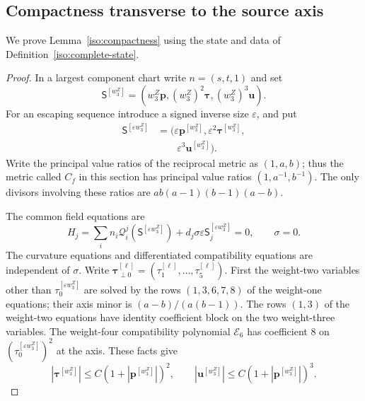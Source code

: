 \documentclass[11pt,a4paper]{article}
\numberwithin{equation}{section}
\theoremstyle{plain}
\theoremstyle{definition}
\theoremstyle{remark}
\begin{document}
\subsection{Compactness transverse to the source axis}
\label{appiso-compactness}
We prove Lemma~\ref{iso:compactness} using the state and data
of Definition~\ref{iso:complete-state}.
\begin{proof}

In a largest component chart write $n=(s,t,1)$ and set
\[
 \mathsf S^{[w_3^Z]}=(w_3^Z\boldsymbol p,(w_3^Z)^2\boldsymbol\tau,(w_3^Z)^3\boldsymbol u).
\]
For an escaping sequence introduce a signed inverse size $\varepsilon$,
and put
\[
 \begin{aligned}
 \mathsf S^{[\varepsilon w_3^Z]}&=(\varepsilon\boldsymbol p^{[w_3^Z]},\varepsilon^2\boldsymbol\tau^{[w_3^Z]},\\
 &\qquad\varepsilon^3\boldsymbol u^{[w_3^Z]}).
 \end{aligned}
\]
Write the principal value ratios of the reciprocal metric as $(1,a,b)$;
thus the metric called $C_f$ in this section has principal value ratios $(1,a^{-1},b^{-1})$.
The only divisors involving these ratios are $ab(a-1)(b-1)(a-b)$.

The common field equations are
\[
 H_j=\sum_i n_i\mathcal Q_i^j(\mathsf S^{[\varepsilon w_3^Z]})+d_j\sigma\varepsilon\mathsf S^{[\varepsilon w_3^Z]}_j=0,
 \qquad \sigma=0.
\]
The curvature equations and differentiated compatibility equations are independent of
$\sigma$.  Write $\boldsymbol\tau_{\perp0}^{[\ell]}=(\tau_1^{[\ell]},\ldots,\tau_5^{[\ell]})$. First the weight-two variables other than $\tau_0^{[\varepsilon w_3^Z]}$ are solved by
the rows $(1,3,6,7,8)$ of the weight-one equations; their axis minor is
$(a-b)/(a(b-1))$.  The rows $(1,3)$ of the weight-two equations have
identity coefficient block on the two weight-three variables.  The
weight-four compatibility polynomial $\mathcal E_6$ has coefficient $8$ on $(\tau_0^{[\varepsilon w_3^Z]})^2$
at the axis.  These facts give
\[
 |\boldsymbol\tau^{[w_3^Z]}|\le C(1+|\boldsymbol p^{[w_3^Z]}|)^2,\qquad |\boldsymbol u^{[w_3^Z]}|\le C(1+|\boldsymbol p^{[w_3^Z]}|)^3.
\]


\end{proof}
\end{document}

